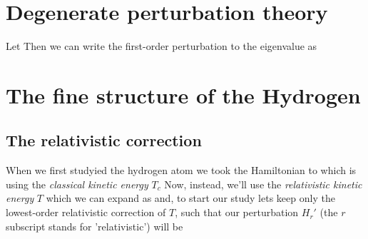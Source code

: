 \documentclass[oneside, 12pt, notitlepage]{book}
\begin{document}
\section{Degenerate perturbation theory}
Let
Then we can write the first-order perturbation to the eigenvalue as

\section{The fine structure of the Hydrogen}

\subsection{The relativistic correction}

When we first studyied the hydrogen atom we took the Hamiltonian to
which is using the \emph{classical kinetic energy} \(T_c\)
Now, instead, we'll use the \emph{relativistic kinetic energy} \(T\)
which we can expand as
and, to start our study lets keep only the lowest-order relativistic correction of \(T\), such that our perturbation \(H_r'\) (the \(r\) subscript stands for 'relativistic') will be
\par
\end{document}
